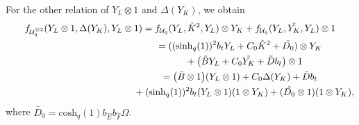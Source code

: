 \documentclass[pdftex]{sigma}
\numberwithin{equation}{section}
\newcommand{\chq}{\mathrm{cosh}_q}
\newcommand{\shq}{\mathrm{sinh}_q}
\newcommand{\tensor}[1]{^{\otimes{#1}}}
\newcommand{\Uq}{\mathcal{U}_q}
\begin{document}
For the other relation of $Y_L\otimes 1$ and $\Delta(Y_K)$, we obtain
\begin{gather*}
	f_{\Uq\tensor{2}}(Y_L\otimes 1,\Delta(Y_K),Y_L\otimes 1) = f_{\Uq}(Y_L,\hat{K}^2,Y_L)\otimes Y_K + f_{\Uq}(Y_L,\tilde{Y_K},Y_L)\otimes 1\\
\hphantom{f_{\Uq\tensor{2}}(Y_L\otimes 1,\Delta(Y_K),Y_L\otimes 1)}{}
	= ((\shq(1))^2b_t Y_L+C_0\hat{K}^2+\tilde{D_0})\otimes Y_K \\
\hphantom{f_{\Uq\tensor{2}}(Y_L\otimes 1,\Delta(Y_K),Y_L\otimes 1)=}{}
 + \big(\tilde{B}Y_L+C_0\tilde{Y_K}+\tilde{D}b_t\big)\otimes 1\\
\hphantom{f_{\Uq\tensor{2}}(Y_L\otimes 1,\Delta(Y_K),Y_L\otimes 1)}{}
	= \big(\tilde{B}\otimes 1\big)(Y_L\otimes 1)+ C_0 \Delta(Y_K)+\tilde{D}b_t \\
\hphantom{f_{\Uq\tensor{2}}(Y_L\otimes 1,\Delta(Y_K),Y_L\otimes 1)=}{}
	+(\shq(1))^2b_t(Y_L\otimes 1)(1\otimes Y_K) + (\tilde{D_0}\otimes 1)(1\otimes Y_K),
\end{gather*}
where $\tilde{D_0}=\chq(1)b_{\hat{E}}b_{\hat{F}}\Omega$.
\end{document}
